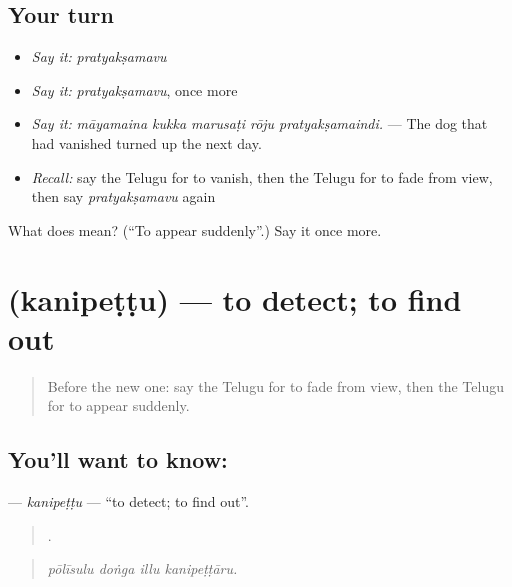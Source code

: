 \subsection*{Your turn}
\begin{itemize}
\raggedright
  \item \emph{Say it:} \emph{pratyakṣamavu}
  \item \emph{Say it:} \emph{pratyakṣamavu}, once more
  \item \emph{Say it:} \emph{māyamaina kukka marusaṭi rōju pratyakṣamaindi.} — The dog that had vanished turned up the next day.
  \item \emph{Recall:} say the Telugu for to vanish, then the Telugu for to fade from view, then say \emph{pratyakṣamavu} again
\end{itemize}

\begin{tcolorbox}[breakable,colback=teal!4,colframe=teal!35!black,title={Before you move on}]
What does  mean? (\textquotedblleft{}To appear suddenly\textquotedblright{}.) Say it once more.
\end{tcolorbox}
\section[\texorpdfstring{\te{కనిపెట్టు} (kanipeṭṭu)}{కనిపెట్టు (kanipeṭṭu)}]{ (kanipeṭṭu) — to detect; to find out}

\label{lesson:TE-C353-kanipettu}



\begin{quote}
Before the new one: say the Telugu for to fade from view, then the Telugu for to appear suddenly.
\end{quote}

\subsection*{You'll want to know: }
\textbf{} — \emph{kanipeṭṭu} — \textquotedblleft{}to detect; to find out\textquotedblright{}.

\begin{quote}
   .
\end{quote}

\begin{quote}
\emph{pōlīsulu doṅga illu kanipeṭṭāru.}
\end{quote}

